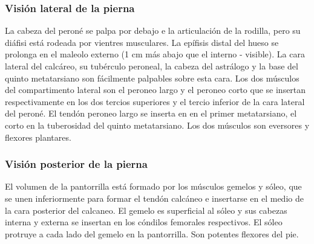 \documentclass[a4paper,12pt]{article} %
\begin{document}
\begin{appendices}
\subsubsection{Visión lateral de la pierna}
La cabeza del peroné se palpa por debajo e la articulación de la rodilla, pero su diáfisi está rodeada por vientres musculares. La epífisis distal del hueso se prolonga en el maleolo externo (1 cm más abajo que el interno - visible). La cara lateral del calcáreo, su tubérculo peroneal, la cabeza del astrálogo y la base del quinto metatarsiano son fácilmente palpables sobre esta cara. Los dos músculos del compartimento lateral son el peroneo largo y el peroneo corto que se insertan respectivamente en los dos tercios superiores y el tercio inferior de la cara lateral del peroné. El tendón peroneo largo se inserta en en el primer metatarsiano, el corto  en la tuberosidad del quinto metatarsiano. Los dos músculos son eversores y flexores plantares.

\subsubsection{Visión posterior de la pierna}
El volumen de la pantorrilla está formado por los músculos gemelos y sóleo, que se unen inferiormente para formar el tendón calcáneo e insertarse en el medio de la cara posterior del calcaneo. El gemelo es superficial al sóleo y sus cabezas interna y externa se insertan en los cóndilos femorales respectivos. El sóleo protruye a cada lado del gemelo en la pantorrilla. Son potentes flexores del pie.


\end{appendices}
\end{document}
